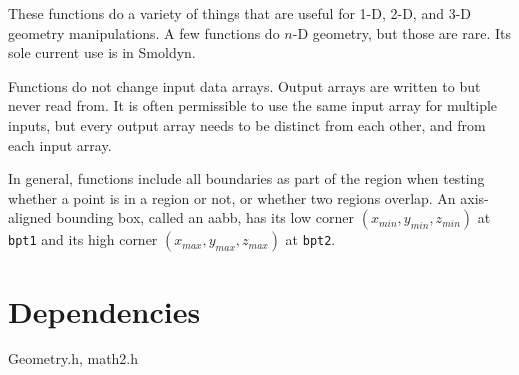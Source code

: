 \documentclass[11pt]{article}
\newcommand {\ttt} {\texttt}
\begin{document}
These functions do a variety of things that are useful for 1-D, 2-D, and 3-D geometry manipulations.  A few functions do $n$-D geometry, but those are rare.  Its sole current use is in Smoldyn.

Functions do not change input data arrays.  Output arrays are written to but never read from.  It is often permissible to use the same input array for multiple inputs, but every output array needs to be distinct from each other, and from each input array.

In general, functions include all boundaries as part of the region when testing whether a point is in a region or not, or whether two regions overlap.  An axis-aligned bounding box, called an aabb, has its low corner $(x_{min}, y_{min}, z_{min})$ at \ttt{bpt1} and its high corner $(x_{max}, y_{max}, z_{max})$ at \ttt{bpt2}.

\section{Dependencies}
Geometry.h, math2.h

\end{document}
